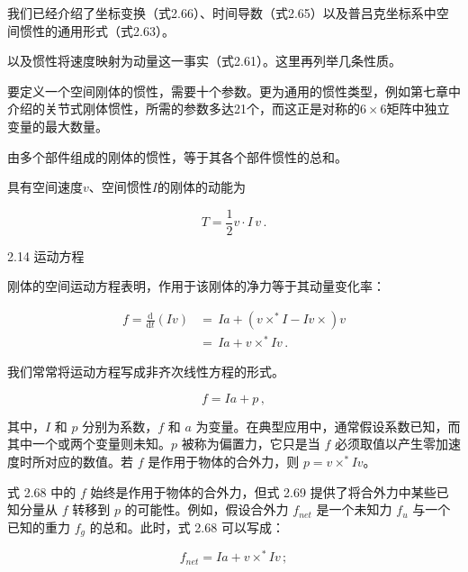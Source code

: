 \documentclass[10pt,a4paper]{book}
\theoremstyle{thmstyle} %
\theoremstyle{defstyle} %
\theoremstyle{prostyle} %
\begin{document}
我们已经介绍了坐标变换（式2.66）、时间导数（式2.65）以及普吕克坐标系中空间惯性的通用形式（式2.63）。



以及惯性将速度映射为动量这一事实（式2.61）。这里再列举几条性质。



要定义一个空间刚体的惯性，需要十个参数。更为通用的惯性类型，例如第七章中介绍的关节式刚体惯性，所需的参数多达21个，而这正是对称的$6 \times 6$矩阵中独立变量的最大数量。



由多个部件组成的刚体的惯性，等于其各个部件惯性的总和。



具有空间速度$v$、空间惯性$I$的刚体的动能为



$$
T = { \frac { 1 } { 2 } } v \cdot I \, v \, .
$$



2.14 运动方程



刚体的空间运动方程表明，作用于该刚体的净力等于其动量变化率：



$$
\begin{array}{rl} { f = \frac { \mathrm { d } } { \mathrm { d } t } \left( I v \right) } & { = \, I a + \left( v \times ^{*} I - I v \times \right) v } \\& { = \, I a + v \times ^{*} I v \, . } \end{array}
$$



我们常常将运动方程写成非齐次线性方程的形式。



$$
f = I a + p \, ,
$$



其中，$I$ 和 $p$ 分别为系数，$f$ 和 $a$ 为变量。在典型应用中，通常假设系数已知，而其中一个或两个变量则未知。$p$ 被称为偏置力，它只是当 $f$ 必须取值以产生零加速度时所对应的数值。若 $f$ 是作用于物体的合外力，则 $p = v \times^* I v$。



式 2.68 中的 $f$ 始终是作用于物体的合外力，但式 2.69 提供了将合外力中某些已知分量从 $f$ 转移到 $p$ 的可能性。例如，假设合外力 $f_{net}$ 是一个未知力 $f_{u}$ 与一个已知的重力 $f_{g}$ 的总和。此时，式 2.68 可以写成：



$$
f _ { n e t } = I a + v \times ^{*} I v \, ;
$$
\end{document}
